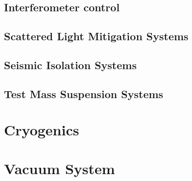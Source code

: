 \subsection{Interferometer control}



\subsection{Scattered Light Mitigation Systems}



\FloatBarrier
\label{Sec:SASandSUS}

\subsection{Seismic Isolation Systems}
\label{Sec:SAS}


\subsection{Test Mass Suspension Systems}
\label{Sec:SUS}

\FloatBarrier

\section{Cryogenics}
\label{Sec:Cryogenics}



\section{Vacuum System}
\label{Sec:Vacuum}


